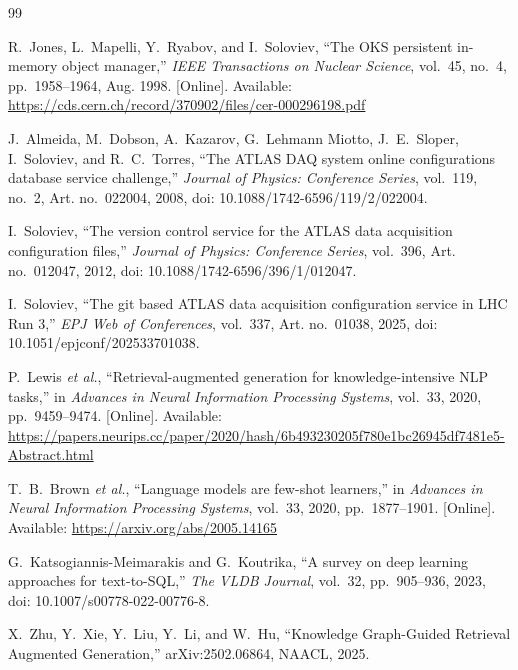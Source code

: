 \documentclass[12pt, a4paper]{report}
\begin{document}
\renewcommand{\bibname}{REFERENCES}
\begin{thebibliography}{99}

R.~Jones, L.~Mapelli, Y.~Ryabov, and I.~Soloviev, ``The OKS persistent
in-memory object manager,'' \textit{IEEE Transactions on Nuclear Science},
vol.~45, no.~4, pp.~1958--1964, Aug. 1998. [Online]. Available:
\url{https://cds.cern.ch/record/370902/files/cer-000296198.pdf}

J.~Almeida, M.~Dobson, A.~Kazarov, G.~Lehmann Miotto, J.~E.~Sloper,
I.~Soloviev, and R.~C.~Torres, ``The ATLAS DAQ system online configurations
database service challenge,'' \textit{Journal of Physics: Conference Series},
vol.~119, no.~2, Art. no.~022004, 2008, doi:
10.1088/1742-6596/119/2/022004.

I.~Soloviev, ``The version control service for the ATLAS data acquisition
configuration files,'' \textit{Journal of Physics: Conference Series},
vol.~396, Art. no.~012047, 2012, doi: 10.1088/1742-6596/396/1/012047.

I.~Soloviev, ``The git based ATLAS data acquisition configuration service in
LHC Run 3,'' \textit{EPJ Web of Conferences}, vol.~337, Art. no.~01038, 2025,
doi: 10.1051/epjconf/202533701038.

P.~Lewis \textit{et al.}, ``Retrieval-augmented generation for
knowledge-intensive NLP tasks,'' in \textit{Advances in Neural Information
Processing Systems}, vol.~33, 2020, pp.~9459--9474. [Online]. Available:
\url{https://papers.neurips.cc/paper/2020/hash/6b493230205f780e1bc26945df7481e5-Abstract.html}

T.~B.~Brown \textit{et al.}, ``Language models are few-shot learners,'' in
\textit{Advances in Neural Information Processing Systems}, vol.~33, 2020,
pp.~1877--1901. [Online]. Available:
\url{https://arxiv.org/abs/2005.14165}

G.~Katsogiannis-Meimarakis and G.~Koutrika, ``A survey on deep learning
approaches for text-to-SQL,'' \textit{The VLDB Journal}, vol.~32, pp.~905--936,
2023, doi: 10.1007/s00778-022-00776-8.

X.~Zhu, Y.~Xie, Y.~Liu, Y.~Li, and W.~Hu, ``Knowledge Graph-Guided Retrieval Augmented Generation,'' arXiv:2502.06864, NAACL, 2025.

\end{thebibliography}
\end{document}
